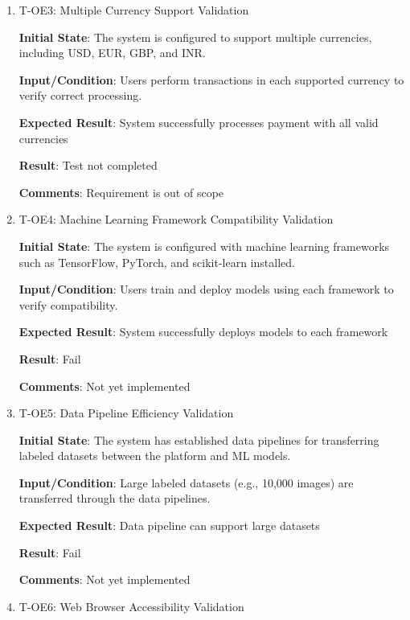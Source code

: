 \documentclass[12pt, titlepage]{article}
\begin{document}
\begin{enumerate}
    \item{T-OE3: Multiple Currency Support Validation\\}
    
    
    \textbf{Initial State}: The system is configured to support multiple currencies, including USD, EUR, GBP, and INR.
    
    \textbf{Input/Condition}: Users perform transactions in each supported currency to verify correct processing.
    
    \textbf{Expected Result}: System successfully processes payment with all valid currencies

    \textbf{Result}: Test not completed

    \textbf{Comments}: Requirement is out of scope
    
    \item{T-OE4: Machine Learning Framework Compatibility Validation\\}
    
    
    \textbf{Initial State}: The system is configured with machine learning frameworks such as TensorFlow, PyTorch, and scikit-learn installed.
    
    \textbf{Input/Condition}: Users train and deploy models using each framework to verify compatibility.
    
    \textbf{Expected Result}: System successfully deploys models to each framework

    \textbf{Result}: Fail

    \textbf{Comments}: Not yet implemented
    
    \item{T-OE5: Data Pipeline Efficiency Validation\\}
    
    \textbf{Initial State}: The system has established data pipelines for transferring labeled datasets between the platform and ML models.
    
    \textbf{Input/Condition}: Large labeled datasets (e.g., 10,000 images) are transferred through the data pipelines.
    
    \textbf{Expected Result}: Data pipeline can support large datasets

    \textbf{Result}: Fail

    \textbf{Comments}: Not yet implemented
    
    
    
    \item{T-OE6: Web Browser Accessibility Validation\\}
    


\end{enumerate}
\end{document}
